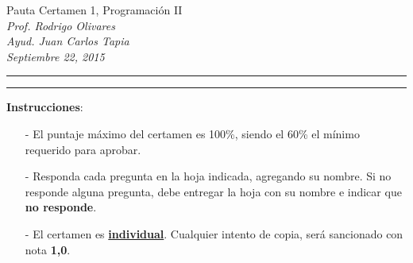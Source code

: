 \documentclass[10pt]{article}
\begin{document}
\begin{center}
    {\Large Pauta Certamen 1, Programaci\'on II} \\
    \emph{\small Prof. Rodrigo Olivares} \\
    \emph{\small Ayud. Juan Carlos Tapia} \\
    \emph{\scriptsize Septiembre 22, 2015}
\end{center}
\vspace*{-35pt}
\begin{center}
    \rule{1\textwidth}{.3pt}
\end{center}
\vspace*{-42pt}
\begin{center}
    \rule{1\textwidth}{2pt}
\end{center}

\vspace*{-15pt}
{\small \textbf{Instrucciones}:}
\vspace*{-15pt}

{\scriptsize
\begin{itemize}
    \item[-] El puntaje m\'aximo del certamen es 100\%, siendo el 60\% el m\'inimo requerido para aprobar.
    \item[-] Responda cada pregunta en la hoja indicada, agregando su nombre. Si no responde alguna pregunta, debe entregar la hoja con su nombre e indicar que \textbf{no responde}.
    \item[-] El certamen es \underline{\textbf{individual}}. Cualquier intento de copia, ser\'a sancionado con nota \textbf{1,0}.
\end{itemize}
}
\vspace*{10pt}

\vspace*{-30pt}
\end{document}
